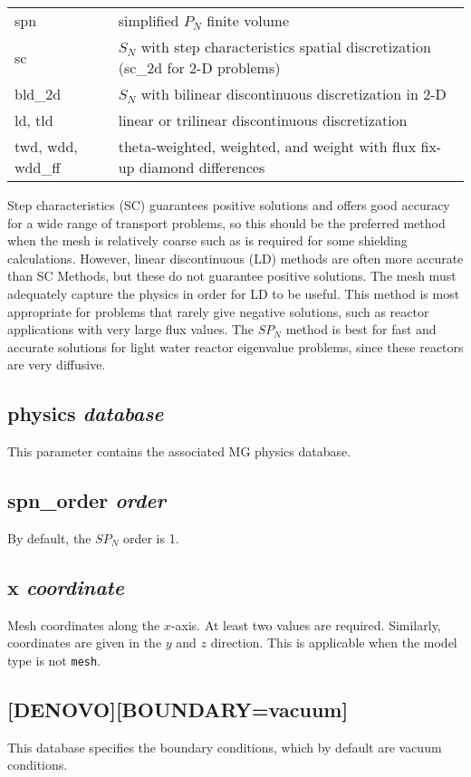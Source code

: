 \documentclass[10pt]{article}
\begin{document}
\begin{tabular}{l l}
spn & simplified \(P_N\) finite volume\\
sc & \(S_N\) with step characteristics spatial discretization (sc_2d for 2-D problems)\\
bld\_2d & \(S_N\) with bilinear discontinuous discretization in 2-D\\
ld, tld & linear or trilinear discontinuous discretization\\
twd, wdd, wdd\_ff & theta-weighted, weighted, and weight with flux fix-up diamond differences\\
\end{tabular}

Step characteristics (SC) guarantees positive solutions and offers good accuracy for a wide range of transport problems, so this should be the preferred method when the mesh is relatively coarse such as is required for some shielding calculations. However, linear discontinuous (LD) methods are often more accurate than SC Methods, but these do not guarantee positive solutions. The mesh must adequately capture the physics in order for LD to be useful. This method is most appropriate for problems that rarely give negative solutions, such as reactor applications with very large flux values. The \(SP_N\) method is best for fast and accurate solutions for light water reactor eigenvalue problems, since these reactors are very diffusive.

\subsection{physics \textit{database}}
This parameter contains the associated MG physics database.

\subsection{spn\_order \textit{order}}
By default, the \(SP_N\) order is 1. 

\subsection{x \textit{coordinate}}
Mesh coordinates along the \(x\)-axis. At least two values are required. Similarly, coordinates are given in the \(y\) and \(z\) direction. This is applicable when the model type is not \texttt{mesh}. 

\subsection{[DENOVO][BOUNDARY=vacuum]}
This database specifies the boundary conditions, which by default are vacuum conditions. 
\end{document}
